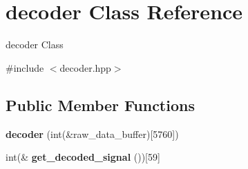 \hypertarget{classdecoder}{}\section{decoder Class Reference}
\label{classdecoder}


decoder Class  




{\ttfamily \#include $<$decoder.\+hpp$>$}

\subsection*{Public Member Functions}
\begin{DoxyCompactItemize}
\item 
{\bfseries decoder} (int(\&raw\+\_\+data\+\_\+buffer)\mbox{[}5760\mbox{]})\hypertarget{classdecoder_aa4861a3d7b4a602bc39c5a98cdacdad8}{}\label{classdecoder_aa4861a3d7b4a602bc39c5a98cdacdad8}

\item 
int(\& {\bfseries get\+\_\+decoded\+\_\+signal} ())\mbox{[}59\mbox{]}\hypertarget{classdecoder_a2c989045f5d1e46d515cf66415df45a5}{}\label{classdecoder_a2c989045f5d1e46d515cf66415df45a5}


\end{DoxyCompactItemize}
